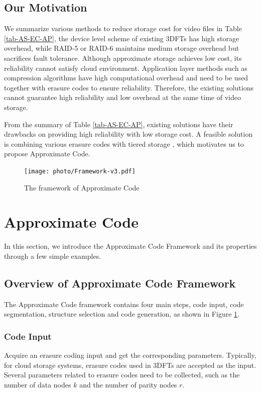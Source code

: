 \documentclass[sigconf]{acmart}
\begin{document}
\subsection{Our Motivation}
We summarize various methods to reduce storage cost for video files in Table \ref{tab-AS-EC-AP}, the device level scheme of existing 3DFTs has high storage overhead, while RAID-5 or RAID-6 maintains medium storage overhead but sacrifices fault tolerance. Although approximate storage achieves low cost, its reliability cannot satisfy cloud environment. Application layer methods such as compression algorithms have high computational overhead and need to be used together with erasure codes to ensure reliability.
Therefore, the existing solutions cannot guarantee high reliability and low overhead at the same time of video storage.

From the summary of Table \ref{tab-AS-EC-AP}, existing solutions have their drawbacks on providing high reliability with low storage cost. 
A feasible solution is combining various erasure codes with tiered storage \cite{krish2014hats} \cite{wang2014balancing} \cite{zhang2010automated} \cite{udipi2012lot}, which motivates us to propose Approximate Code.

\begin{figure}[ht!]
\centering
\texttt{[image: photo/Framework-v3.pdf]}
\caption{The framework of Approximate Code}\label{fig-framework}
\end{figure}

\section{Approximate Code}\label{ApCode}
In this section, we introduce the Approximate Code Framework and its properties through a few simple examples.

\subsection{Overview of Approximate Code Framework}
The Approximate Code framework contains four main steps, code input, code segmentation, structure selection and code generation, as shown in Figure \ref{fig-framework}.

\subsubsection{Code Input}
Acquire an erasure coding input and get the corresponding parameters. Typically, for cloud storage systems, erasure codes used in 3DFTs are accepted as the input. Several parameters related to erasure codes need to be collected, such as the number of data nodes $k$ and the number of parity nodes $r$.
\end{document}
